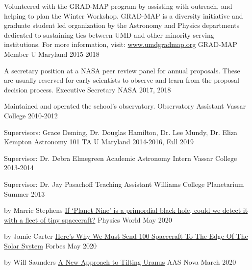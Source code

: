 \documentclass[]{awesome-cv}
\begin{document}
\begin{cventries}
	\cventry
	{Volunteered with the GRAD-MAP program by assisting with outreach, and helping to plan the Winter Workshop. GRAD-MAP is a diversity initiative and graduate student led organization by the Astronomy and Physics departments dedicated to sustaining ties between UMD and other minority serving institutions. For more information, visit: \href{https://www.umdgradmap.org/}{www.umdgradmap.org}}
	{GRAD-MAP Member}
	{U Maryland}
	{2015-2018}
	{}
	
	\vspace{-5mm}
	\cventry
	{A secretary position at a NASA peer review panel for annual proposals. These are usually reserved for early scientists to observe and learn from the proposal decision process.}
	{Executive Secretary}
	{NASA}
	{2017, 2018}
	{}
	
	\vspace{-5mm}
	\cventry
	{Maintained and operated the school's observatory.}
	{Observatory Assistant}
	{Vassar College}
	{2010-2012}
	{}
	
	\vspace{-5mm}
\end{cventries}

\begin{cventries}
	\cventry
	{Supervisors: Grace Deming, Dr. Douglas Hamilton, Dr. Lee Mundy, Dr. Eliza Kempton}
	{Astronomy 101 TA}
	{U Maryland}
	{2014-2016, Fall 2019}
	{}
	
	\vspace{-6mm}
	\cventry
	{Supervisor: Dr. Debra Elmegreen}
	{Academic Astronomy Intern}
	{Vassar College}
	{2013-2014}
	{}
	
	\vspace{-6mm}
	\cventry
	{Supervisor: Dr. Jay Pasachoff}
	{Teaching Assistant}
	{Williams College Planetarium}
	{Summer 2013}
	{}
	
	\vspace{-5mm}
\end{cventries}

\begin{cventries}
	\cventry
	{by Marric Stephens}
	{\href{https://physicsworld.com/a/if-planet-nine-is-a-primordial-black-hole-could-we-detect-it-with-a-fleet-of-tiny-spacecraft/}{If ‘Planet Nine’ is a primordial black hole, could we detect it with a fleet of tiny spacecraft?}}
	{Physics World}
	{May 2020}
	{}
	
	\vspace{-5mm}
	\cventry
	{by Jamie Carter}
	{\href{https://tinyurl.com/y9yth6w2}{Here’s Why We Must Send 100 Spacecraft To The Edge Of The Solar System}}
	{Forbes}
	{May 2020}
	{}
	
	\vspace{-5mm}
	\cventry
	{by Will Saunders}
	{\href{https://aasnova.org/2020/03/10/a-new-approach-to-tilting-uranus/}{A New Approach to Tilting Uranus}}
	{AAS Nova}
	{March 2020}
	{}
	
	\vspace{-5mm}
\end{cventries}
\end{document}
